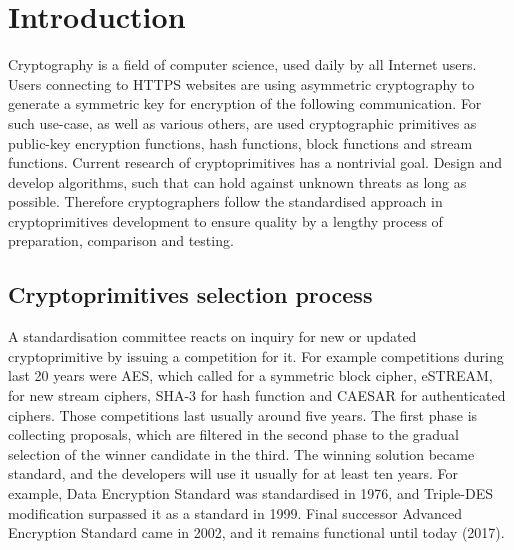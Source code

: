 \documentclass[
  print, %
  Table,   %
  nolof,     %
  nolot,     %
  11pt, %
  oneside  %
]{fithesis3}
\begin{document}
\setlength{\parskip}{5pt}
\setlength{\parindent}{0pt}


\chapter{Introduction}
\label{chap:introduction}

Cryptography is a field of computer science, used daily by all Internet users. Users connecting to HTTPS websites are using asymmetric cryptography to generate a symmetric key for encryption of the following communication. For such use-case, as well as various others, are used cryptographic primitives as public-key encryption functions, hash functions, block functions and stream functions. Current research of cryptoprimitives has a nontrivial goal. Design and develop algorithms, such that can hold against unknown threats as long as possible. Therefore cryptographers follow the standardised approach in cryptoprimitives development to ensure quality by a lengthy process of preparation, comparison and testing.

\section{Cryptoprimitives selection process}
\label{sec:crypto-sel-proc}

A standardisation committee reacts on inquiry for new or updated cryptoprimitive by issuing a competition for it. For example competitions during last 20 years were AES, which called for a symmetric block cipher, eSTREAM, for new stream ciphers, SHA-3 for hash function and CAESAR for authenticated ciphers. Those competitions last usually around five years. The first phase is collecting proposals, which are filtered in the second phase to the gradual selection of the winner candidate in the third. The winning solution became standard, and the developers will use it usually for at least ten years. For example, Data Encryption Standard was standardised in 1976, and Triple-DES modification surpassed it as a standard in 1999. Final successor Advanced Encryption Standard came in 2002, and it remains functional until today (2017).
\end{document}
